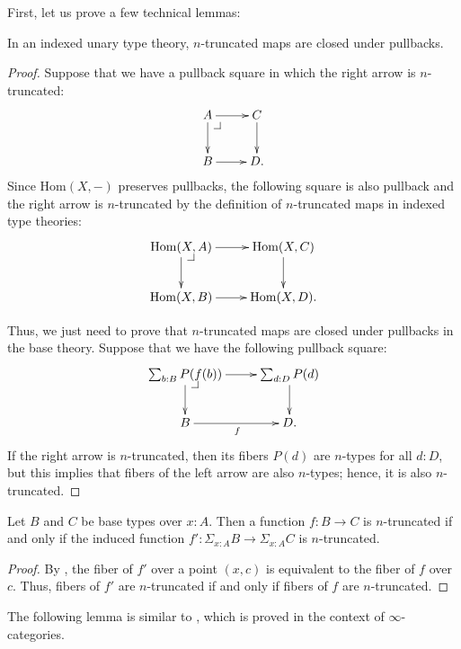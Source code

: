\documentclass[reqno]{mscs}
\makeatletter
\newcommand{\fs}[1]{\mathrm{#1}}
\newcommand{\Hom}{\fs{Hom}}
\numberwithin{figure}{section}
\newcommand{\pb}[1][dr]{\save*!/#1-1.2pc/#1:(-1,1)@^{|-}\restore}
\makeatother
\begin{document}
First, let us prove a few technical lemmas:

\begin{lem}[trunc-pb]
In an indexed unary type theory, $n$-truncated maps are closed under pullbacks.
\end{lem}
\begin{proof}
Suppose that we have a pullback square in which the right arrow is $n$-truncated:
\[ \xymatrix{ A \ar[r] \ar[d] \pb   & C \ar[d] \\
              B \ar[r]              & D.
            } \]
Since $\Hom(X,-)$ preserves pullbacks, the following square is also pullback and the right arrow is $n$-truncated by the definition of $n$-truncated maps in indexed type theories:
\[ \xymatrix{ \Hom(X,A) \ar[r] \ar[d] \pb   & \Hom(X,C) \ar[d] \\
              \Hom(X,B) \ar[r]              & \Hom(X,D).
            } \]

Thus, we just need to prove that $n$-truncated maps are closed under pullbacks in the base theory.
Suppose that we have the following pullback square:
\[ \xymatrix{ \sum_{b : B} P(f(b)) \ar[r] \ar[d] \pb    & \sum_{d : D} P(d) \ar[d] \\
              B \ar[r]_f                                & D.
            } \]
If the right arrow is $n$-truncated, then its fibers $P(d)$ are $n$-types for all $d : D$, but this implies that fibers of the left arrow are also $n$-types; hence, it is also $n$-truncated.
\end{proof}

\begin{lem}
Let $B$ and $C$ be base types over $x : A$.
Then a function $f : B \to C$ is $n$-truncated if and only if the induced function $f' : \Sigma_{x : A} B \to \Sigma_{x : A} C$ is $n$-truncated.
\end{lem}
\begin{proof}
By \cite[Theorem~4.7.6]{hottbook}, the fiber of $f'$ over a point $(x,c)$ is equivalent to the fiber of $f$ over $c$.
Thus, fibers of $f'$ are $n$-truncated if and only if fibers of $f$ are $n$-truncated.
\end{proof}

The following lemma is similar to \cite[Lemma~5.5.6.15]{lurie-topos}, which is proved in the context of $\infty$-categories.
\end{document}
